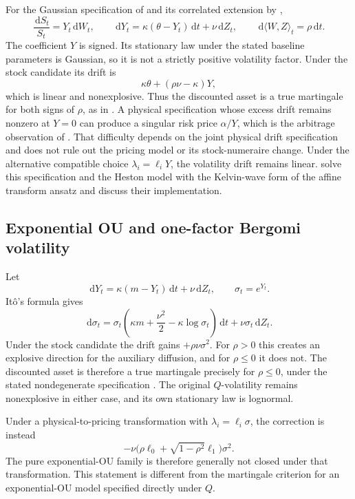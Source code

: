 \documentclass[11pt,a4paper]{article}
\theoremstyle{definition}
\theoremstyle{remark}
\newcommand{\dd}{\,\mathrm{d}}
\begin{document}
For the Gaussian specification of \citet{SteinStein1991} and its correlated extension by \citet{SchobelZhu1999},
\[
 \frac{\dd S_t}{S_t}=Y_t\dd W_t,\qquad
 \dd Y_t=\kappa(\theta-Y_t)\dd t+\nu\dd Z_t,\qquad
 \dd\langle W,Z\rangle_t=\rho\dd t.
\]
The coefficient \(Y\) is signed. Its stationary law under the stated baseline parameters is Gaussian, so it is not a strictly positive volatility factor. Under the stock candidate its drift is
\[
 \kappa\theta+(\rho\nu-\kappa)Y,
\]
which is linear and nonexplosive. Thus the discounted asset is a true martingale for both signs of \(\rho\), as in \citet[Proposition~5.7]{BernardCuiMcLeish2017}. A physical specification whose excess drift remains nonzero at \(Y=0\) can produce a singular risk price \(\alpha/Y\), which is the arbitrage observation of \citet{WongHeyde2006}. That difficulty depends on the joint physical drift specification and does not rule out the pricing model or its stock-numeraire change. Under the alternative compatible choice \(\lambda_i=\ell_iY\), the volatility drift remains linear.
\citet{LiptonSepp2008} solve this specification and the Heston model with the Kelvin-wave form of the affine transform ansatz and discuss their implementation.


\subsection{Exponential OU and one-factor Bergomi volatility}

Let
\[
 \dd Y_t=\kappa(m-Y_t)\dd t+\nu\dd Z_t,\qquad \sigma_t=e^{Y_t}.
\]
It\^o's formula gives
\begin{equation}
 \dd\sigma_t=\sigma_t\left(\kappa m+\frac{\nu^2}{2}
                     -\kappa\log\sigma_t\right)\dd t
                   +\nu\sigma_t\dd Z_t.
 \label{eq:expou}
\end{equation}
Under the stock candidate the drift gains \(+\rho\nu\sigma^2\). For \(\rho>0\) this creates an explosive direction for the auxiliary diffusion, and for \(\rho\leq0\) it does not. The discounted asset is therefore a true martingale precisely for \(\rho\leq0\), under the stated nondegenerate specification \citep{Sin1998,Jourdain2004,LionsMusiela2007}. The original \(Q\)-volatility remains nonexplosive in either case, and its own stationary law is lognormal.

Under a physical-to-pricing transformation with \(\lambda_i=\ell_i\sigma\), the correction is instead
\[
 -\nu\bigl(\rho\ell_0+\sqrt{1-\rho^2}\ell_1\bigr)\sigma^2.
\]
The pure exponential-OU family is therefore generally not closed under that transformation. This statement is different from the martingale criterion for an exponential-OU model specified directly under \(Q\).
\end{document}
